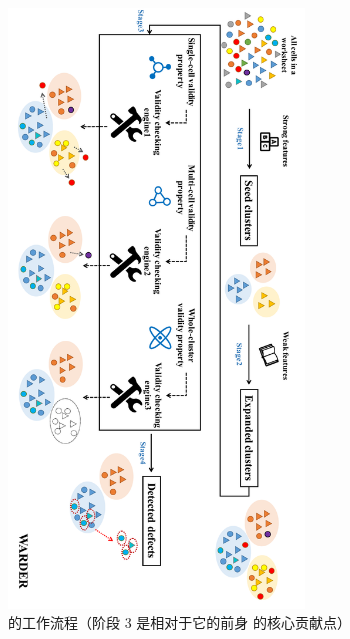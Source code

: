 \begin{figure}[tbp]    
    \centering
    \includegraphics[width=0.7\textwidth]{figure/figure1-copy.pdf}
    \caption{\wa 的工作流程（阶段 3 是相对于它的前身 \cu 的核心贡献点）}
    \label{figure1}
\end{figure}